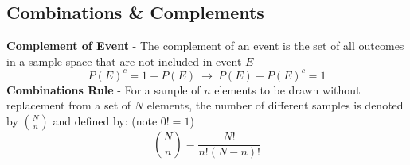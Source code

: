 \documentclass[a4paper]{article}
\let\bf\textbf
\begin{document}
\subsection{Combinations \& Complements}
\bf{Complement of Event} - The complement of an event is the set of all outcomes in a sample space that are \underline{not} included in event $E$
\begin{equation}
    P(E)^c = 1 - P(E) \ \to \ P(E) + P(E)^c = 1
\end{equation} 
\bf{Combinations Rule} - For a sample of $n$ elements to be drawn without replacement from a set of $N$ elements, the number of different samples is denoted by $\binom Nn$ and defined by: \hspace{15mm}(note $0! = 1$)
\begin{equation}
    \binom Nn = \frac{N!}{n!(N-n)!}
\end{equation}
\end{document}
